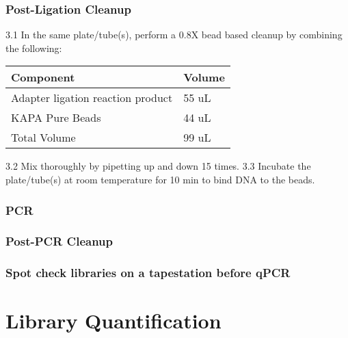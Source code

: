 \documentclass[
  letterpaper,
  DIV=11,
  numbers=noendperiod]{scrreprt}
\begin{document}
\hypertarget{post-ligation-cleanup}{%
\subsection*{\texorpdfstring{\textbf{Post-Ligation
Cleanup}}{Post-Ligation Cleanup}}\label{post-ligation-cleanup}}

3.1 In the same plate/tube(s), perform a 0.8X bead based cleanup by
combining the following:

\begin{longtable}[]{@{}ll@{}}
\toprule()
\textbf{Component} & \textbf{Volume} \\
\midrule()
\endhead
Adapter ligation reaction product & 55 uL \\
KAPA Pure Beads & 44 uL \\
Total Volume & 99 uL \\
\bottomrule()
\end{longtable}

3.2 Mix thoroughly by pipetting up and down 15 times. 3.3 Incubate the
plate/tube(s) at room temperature for 10 min to bind DNA to the beads.

\hypertarget{pcr}{%
\subsection*{\texorpdfstring{\textbf{PCR}}{PCR}}\label{pcr}}

\hypertarget{post-pcr-cleanup}{%
\subsection*{\texorpdfstring{\textbf{Post-PCR
Cleanup}}{Post-PCR Cleanup}}\label{post-pcr-cleanup}}

\hypertarget{spot-check-libraries-on-a-tapestation-before-qpcr}{%
\subsection*{\texorpdfstring{\textbf{Spot check libraries on a
tapestation before
qPCR}}{Spot check libraries on a tapestation before qPCR}}\label{spot-check-libraries-on-a-tapestation-before-qpcr}}

\hypertarget{library-quantification}{%
\chapter{Library Quantification}\label{library-quantification}}
\end{document}

